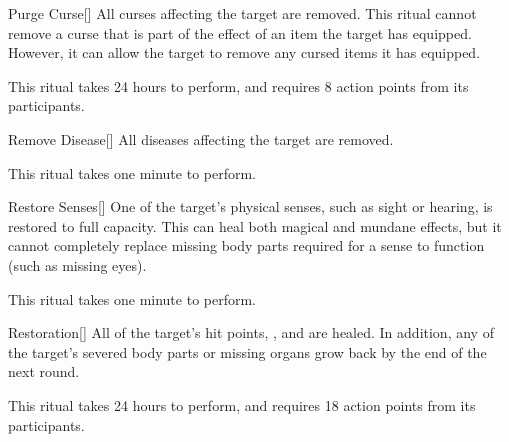 \lowercase{\hypertarget{spell:Purge Curse}{}}\label{spell:Purge Curse}
\begin{apability}[Rank 3]{\hypertarget{spell:Purge Curse}{Purge Curse}}[]
All curses affecting the target are removed.
This ritual cannot remove a curse that is part of the effect of an item the target has equipped.
However, it can allow the target to remove any cursed items it has equipped.

This ritual takes 24 hours to perform, and requires 8 action points from its participants.
\end{apability}
\vspace{0.25em}



\lowercase{\hypertarget{spell:Remove Disease}{}}\label{spell:Remove Disease}
\begin{apability}[Rank 3]{\hypertarget{spell:Remove Disease}{Remove Disease}}[]
All diseases affecting the target are removed.

This ritual takes one minute to perform.
\end{apability}
\vspace{0.25em}



\lowercase{\hypertarget{spell:Restore Senses}{}}\label{spell:Restore Senses}
\begin{apability}[Rank 3]{\hypertarget{spell:Restore Senses}{Restore Senses}}[]
One of the target's physical senses, such as sight or hearing, is restored to full capacity.
This can heal both magical and mundane effects, but it cannot completely replace missing body parts required for a sense to function (such as missing eyes).

This ritual takes one minute to perform.
\end{apability}
\vspace{0.25em}



\lowercase{\hypertarget{spell:Restoration}{}}\label{spell:Restoration}
\begin{apability}[Rank 4]{\hypertarget{spell:Restoration}{Restoration}}[]
All of the target's hit points, , and  are healed.
In addition, any of the target's severed body parts or missing organs grow back by the end of the next round.

This ritual takes 24 hours to perform, and requires 18 action points from its participants.
\end{apability}
\vspace{0.25em}



